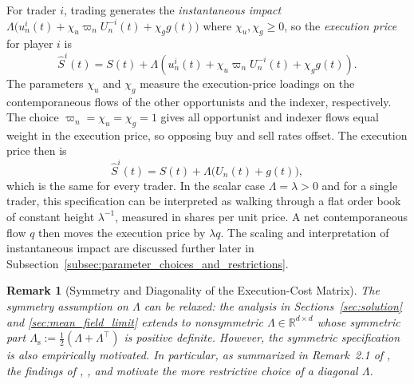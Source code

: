 \documentclass[12pt]{article}
\numberwithin{equation}{section}
\newtheorem{remark}[theorem]{Remark}
\theoremstyle{definition}
\begin{document}
For trader \(i\), trading generates the \emph{instantaneous impact}
\(\Lambda\bigl(u_n^i(t)+\chi_u\varpi_n U_n^{-i}(t)+\chi_g g(t)\bigr)\) where \(\chi_u,\chi_g\geq0\), so
the \emph{execution price} for player \(i\) is
\begin{equation}\label{eq:execution_price}
\widehat S^i(t)
=
S(t)+\Lambda\left(
u_n^i(t)+\chi_u\varpi_n U_n^{-i}(t)+\chi_g g(t)
\right).
\end{equation}
The parameters \(\chi_u\) and \(\chi_g\)
measure the execution-price loadings on the contemporaneous flows of the
other opportunists and the indexer, respectively.
The choice \(\varpi_n=\chi_u=\chi_g=1\) gives all opportunist and indexer
flows equal weight in the execution price, so opposing buy and sell rates
offset. The execution price then is
\[
\widehat S^i(t)
=
S(t)+\Lambda\bigl(U_n(t)+g(t)\bigr),
\]
which is the same for every trader. In the scalar case
\(\Lambda=\lambda>0\) and for a single trader, this specification can be interpreted as walking
through a flat order book of constant height \(\lambda^{-1}\), measured in
shares per unit price. A net contemporaneous flow \(q\) then moves the
execution price by \(\lambda q\). The scaling and interpretation of instantaneous impact are discussed further
later in Subsection~\ref{subsec:parameter_choices_and_restrictions}.

\begin{remark}[Symmetry and Diagonality of the Execution-Cost Matrix]
The symmetry assumption on \(\Lambda\) can be relaxed: the analysis in
Sections~\ref{sec:solution} and \ref{sec:mean_field_limit} extends to
nonsymmetric \(\Lambda\in\mathbb R^{d\times d}\) whose symmetric part
\(\Lambda_{\mathrm{s}}:=\frac{1}{2}(\Lambda+\Lambda^\top)\) is positive
definite.
However, the symmetric specification is also empirically motivated. In particular, as
summarized in Remark~2.1 of \citet{jaber2026}, the findings of
\citet{capponi_cont_2020}, \citet{cont_cucuringu_zhang_2023}, and
\citet{lecoz_mastromatteo_challet_benzaquen_2024} motivate the more restrictive
choice of a diagonal \(\Lambda\).
\end{remark}
\end{document}
